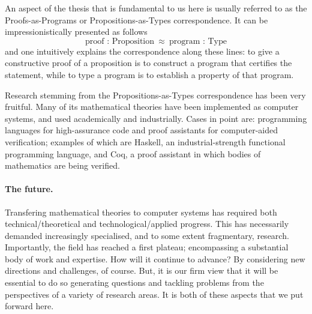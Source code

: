 \documentclass[11pt,twocolumn]{article}
\newenvironment{myitemize}
  {\begin{list}{$\bullet$}
  {\setlength{\topsep}{1pt}
   \setlength{\partopsep}{1pt}
   \setlength{\itemsep}{0pt}
   \setlength{\parsep}{0pt}
   \setlength{\leftmargin}{1em}
   \setlength{\labelwidth}{.5em}}}
  {\end{list}}
\newcommand{\eg}{\emph{eg.}}
\begin{document}
An aspect of the thesis that is fundamental to us here is usually referred
to as the Proofs-as-Programs or Propositions-as-Types correspondence.
It can be impressionistically %
presented %
as follows
\[%
%
  \mbox{proof : Proposition} 
  \enspace \approx \enspace 
  \mbox{program : Type} 
\]
and one intuitively explains the correspondence along these lines: %
  to give a constructive proof of a proposition 
  is to construct a program that certifies the statement, 
  while
  to type a program is to establish a property of that program.

Research stemming from the Propositions-as-Types correspondence has been
very fruitful.  Many of its mathematical theories have been implemented as
computer systems, and used academically and industrially.  Cases in point
are: programming languages for high-assurance code and proof assistants
for computer-aided verification; examples of which are
Haskell, %
an industrial-strength functional programming language, 
and Coq, %
a proof assistant in which bodies of mathematics are being verified.

\paragraph*{The future.}

Transfering mathematical theories to computer
systems has required both technical/theoretical and technological/applied
progress.  This has necessarily demanded increasingly specialised, and to
some extent fragmentary, research.  
Importantly, %
the field has reached a first plateau; encompassing a substantial body of
work and expertise.  
How %
will it continue to advance?  
By considering new directions and challenges, of course.  
But, 
it is our firm view that %
it will be essential to do so generating questions and tackling problems
from the perspectives of a variety of research areas.  
It is both of these aspects that we put forward here.
\end{document}
